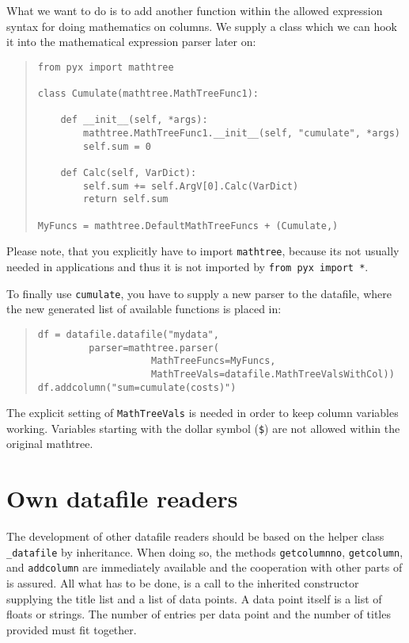 What we want to do is to add another function within the allowed
expression syntax for doing mathematics on columns. We supply a class
which we can hook it into the mathematical expression parser later on:

\begin{quote}
\begin{verbatim}
from pyx import mathtree

class Cumulate(mathtree.MathTreeFunc1):

    def __init__(self, *args):
        mathtree.MathTreeFunc1.__init__(self, "cumulate", *args)
        self.sum = 0

    def Calc(self, VarDict):
        self.sum += self.ArgV[0].Calc(VarDict)
        return self.sum

MyFuncs = mathtree.DefaultMathTreeFuncs + (Cumulate,)
\end{verbatim}
\end{quote}

Please note, that you explicitly have to import \verb|mathtree|,
because its not usually needed in \PyX{} applications and thus it is
not imported by \verb|from pyx import *|.

To finally use \verb|cumulate|, you have to supply a new parser to the
datafile, where the new generated list of available functions is
placed in:

\begin{quote}
\begin{verbatim}
df = datafile.datafile("mydata",
         parser=mathtree.parser(
                    MathTreeFuncs=MyFuncs,
                    MathTreeVals=datafile.MathTreeValsWithCol))
df.addcolumn("sum=cumulate(costs)")
\end{verbatim}
\end{quote}

The explicit setting of \verb|MathTreeVals| is needed in order to keep
column variables working. Variables starting with the dollar symbol
(\verb|$|) are not allowed within the original mathtree.

\section{Own datafile readers}

The development of other datafile readers should be based on the
helper class \verb|_datafile| by inheritance. When doing so, the
methods \verb|getcolumnno|, \verb|getcolumn|, and \verb|addcolumn| are
immediately available and the cooperation with other parts of \PyX{}
is assured. All what has to be done, is a call to the inherited
constructor supplying the title list and a list of data points. A data
point itself is a list of floats or strings. The number of entries per
data point and the number of titles provided must fit together.
